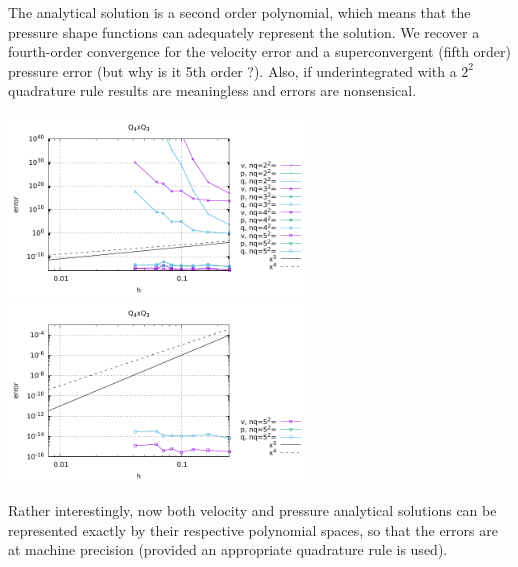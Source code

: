 The analytical solution is a second order polynomial, which means that the pressure 
shape functions can adequately represent the solution. We recover a fourth-order 
convergence for the velocity error and a superconvergent (fifth order) pressure error 
(but why is it 5th order ?).
Also, if underintegrated with a $2^2$ quadrature rule results are meaningless
and errors are nonsensical.

\begin{center}
\includegraphics[width=8cm]{python_codes/fieldstone_48/results/errors4.pdf}
\includegraphics[width=8cm]{python_codes/fieldstone_48/results/errors4_b.pdf}\\
\end{center}

Rather interestingly, now both velocity and pressure analytical solutions 
can be represented exactly by their respective polynomial spaces, so that 
the errors are at machine precision (provided an appropriate quadrature rule is used).



